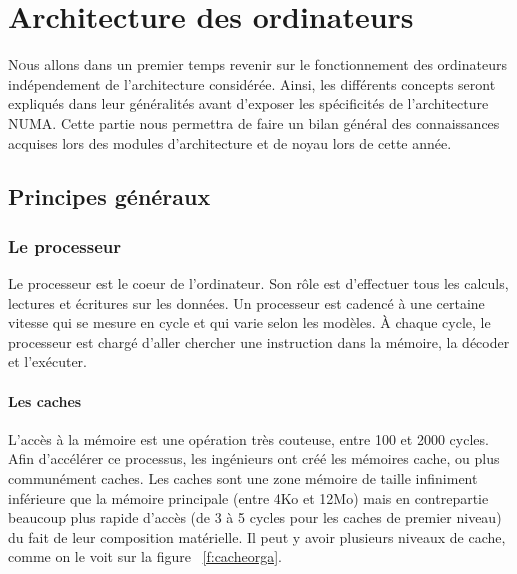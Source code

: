 \chapter{Architecture des ordinateurs}

  \lettrine[nindent=0em,lines=3]{N} ous allons dans un premier temps revenir sur
  le fonctionnement des ordinateurs indépendement de l'architecture
  considérée. Ainsi, les différents concepts seront expliqués dans leur
  généralités avant d'exposer les spécificités de l'architecture NUMA. Cette
  partie nous permettra de faire un bilan général des connaissances acquises
  lors des modules d'architecture et de noyau lors de cette année.


  \section{Principes généraux}

    \subsection{Le processeur}

    Le processeur est le coeur de l'ordinateur.  Son rôle est d'effectuer tous
    les calculs, lectures et écritures sur les données. Un processeur est
    cadencé à une certaine vitesse qui se mesure en cycle et qui varie selon les
    modèles. À chaque cycle, le processeur est chargé d'aller chercher une
    instruction dans la mémoire, la décoder et l'exécuter.

    \subsubsection{Les caches}

      L'accès à la mémoire est une opération très couteuse, entre 100 et 2000
      cycles\cite{Lepers2014}. Afin d'accélérer ce processus, les ingénieurs ont
      créé les mémoires cache, ou plus communément caches. Les caches sont une
      zone mémoire de taille infiniment inférieure que la mémoire principale
      (entre 4Ko et 12Mo) mais en contrepartie beaucoup plus rapide d'accès (de
      3 à 5 cycles pour les caches de premier niveau) du fait de leur
      composition matérielle. Il peut y avoir plusieurs niveaux de cache, comme
      on le voit sur la figure ~\ref{f:cacheorga}.


